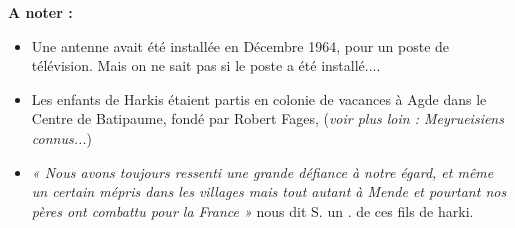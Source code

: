 \textbf{A noter :}

\begin{itemize}
    \item Une antenne avait été installée en Décembre 1964, pour un poste de télévision.
    Mais on ne sait pas si le poste a été installé....
    
    \item Les enfants de Harkis étaient partis en colonie de vacances à Agde dans le
    Centre de Batipaume, fondé par Robert Fages, (\textit{voir plus loin : Meyrueisiens
    connus...})
    
    \item \textit{« Nous avons toujours ressenti une grande défiance à notre égard, et même un certain mépris
    dans les villages mais tout autant à Mende et pourtant nos pères ont combattu pour la
    France »} nous dit S. un . de ces fils de harki.
\end{itemize}
